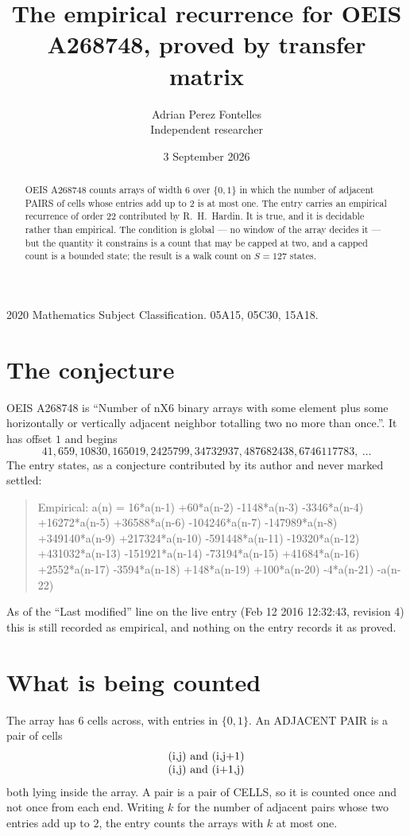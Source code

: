 \documentclass[11pt,a4paper]{article}
\title{The empirical recurrence for OEIS A268748, proved by transfer matrix}
\author{Adrian Perez Fontelles\\ \small Independent researcher}
\date{3 September 2026}
\theoremstyle{plain}
\theoremstyle{definition}
\begin{document}
\maketitle

\begin{abstract}
OEIS A268748 counts arrays of width $6$ over $\{0,1\}$ in which the number of adjacent PAIRS of
cells whose entries add up to $2$ is at most one. The entry carries an empirical recurrence of
order $22$ contributed by R.~H.~Hardin. It is true, and it is decidable rather than
empirical. The condition is global --- no window of the array decides it --- but the quantity
it constrains is a count that may be capped at two, and a capped count is a bounded state; the
result is a walk count on $S=127$ states.
\end{abstract}

\noindent\small 2020 Mathematics Subject Classification. 05A15, 05C30, 15A18.\normalsize

\section{The conjecture}

OEIS A268748 is ``Number of nX6 binary arrays with some element plus some horizontally or vertically adjacent neighbor totalling two no more than once.''. It has offset $1$ and begins
\[
41, 659, 10830, 165019, 2425799, 34732937, 487682438, 6746117783,\ \dots
\]
The entry states, as a conjecture contributed by its author and never marked settled:
\begin{quote}
Empirical: a(n) = 16*a(n-1) +60*a(n-2) -1148*a(n-3) -3346*a(n-4) +16272*a(n-5) +36588*a(n-6) -104246*a(n-7) -147989*a(n-8) +349140*a(n-9) +217324*a(n-10) -591448*a(n-11) -19320*a(n-12) +431032*a(n-13) -151921*a(n-14) -73194*a(n-15) +41684*a(n-16) +2552*a(n-17) -3594*a(n-18) +148*a(n-19) +100*a(n-20) -4*a(n-21) -a(n-22)
\end{quote}
As of the ``Last modified'' line on the live entry (Feb 12 2016 12:32:43, revision 4) this is still
recorded as empirical, and nothing on the entry records it as proved.

\section{What is being counted}

The array has $6$ cells across, with entries in $\{0,1\}$. An ADJACENT PAIR is a pair of cells
\[
\begin{array}{l}
$(i,j)\text{ and }(i,j{+}1)$ \\
$(i,j)\text{ and }(i{+}1,j)$ \\
\end{array}
\]
both lying inside the array. A pair is a pair of CELLS, so it is counted once and not once from
each end. Writing $k$ for the number of adjacent pairs whose two entries add up to $2$, the
entry counts the arrays with $k$ at most one.
\end{document}

